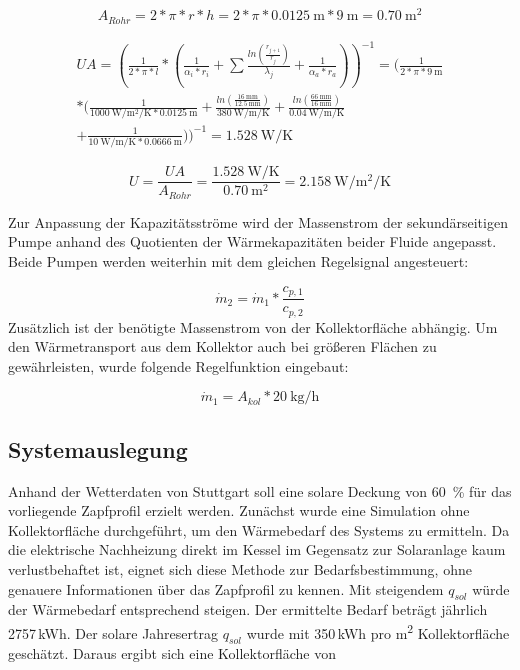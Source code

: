 \begin{equation}
	\label{eq:Arohr}
	A_{Rohr} = 2*\pi*r*h = 2*\pi*\SI{0,0125}{\meter}*\SI{9}{\meter}=\SI{0,70}{\square\meter}
\end{equation}

\begin{multline}
	\label{eq:UA}
UA = (\frac{1}{2*\pi*l}*(\frac{1}{\alpha_i*r_i}+\sum\frac{ln(\frac{r_{j+1}}{r_j})}{\lambda_j}+\frac{1}{\alpha_a*r_a}))^{-1} = (\frac{1}{2*\pi*\SI{9}{\meter}}\\*(\frac{1}{\SI{1000}{\watt\per\square\meter\per\kelvin}*\SI{0,0125}{\meter}}+\frac{ln(\frac{\SI{16}{\milli\meter}}{\SI{12,5}{\milli\meter}})}{\SI{380}{\watt\per\meter\per\kelvin}}+\frac{ln(\frac{\SI{66}{\milli\meter}}{\SI{16}{\milli\meter}})}{\SI{0,04}{\watt\per\meter\per\kelvin}}\\+\frac{1}{\SI{10}{\watt\per\meter\per\kelvin}*\SI{0,0666}{\meter}}))^{-1}=\SI{1,528}{\watt\per\kelvin}
\end{multline}


\begin{equation}
	\label{eq:U}
	U=\frac{UA}{A_{Rohr}}=\frac{\SI{1,528}{\watt\per\kelvin}}{\SI{0,70}{\square\meter}}=\SI{2,158}{\watt\per\square\meter\per\kelvin}
\end{equation}


Zur Anpassung der Kapazitätsströme wird der Massenstrom der sekundärseitigen Pumpe anhand des Quotienten der Wärmekapazitäten beider Fluide angepasst. Beide Pumpen werden weiterhin mit dem gleichen Regelsignal angesteuert:

\begin{equation}
	\label{eq:dotm}
	\dot m_{2}=\dot m_{1}*\frac{c_{p,1}}{c_{p,2}}
\end{equation}
Zusätzlich ist der benötigte Massenstrom von der Kollektorfläche abhängig. Um den Wärmetransport aus dem Kollektor auch bei größeren Flächen zu gewährleisten, wurde folgende Regelfunktion eingebaut:

\begin{equation}
	\label{eq:dotm2}
	\dot m_{1}=A_{kol}*\SI{20}{\kilogram\per\hour}
\end{equation}


\subsection{Systemauslegung}
Anhand der Wetterdaten von Stuttgart soll eine solare Deckung von \SI{60}{\percent} für das vorliegende Zapfprofil erzielt werden. Zunächst wurde eine Simulation ohne Kollektorfläche durchgeführt, um den Wärmebedarf des Systems zu ermitteln. Da die elektrische Nachheizung direkt im Kessel im Gegensatz zur Solaranlage kaum verlustbehaftet ist, eignet sich diese Methode zur Bedarfsbestimmung, ohne genauere Informationen über das Zapfprofil zu kennen. Mit steigendem $q_{sol}$ würde der Wärmebedarf entsprechend steigen. Der ermittelte Bedarf beträgt jährlich 2757\,kWh. Der solare Jahresertrag $q_{sol}$ wurde mit 350\,kWh pro m\textsuperscript{2} Kollektorfläche geschätzt. Daraus ergibt sich eine Kollektorfläche von


